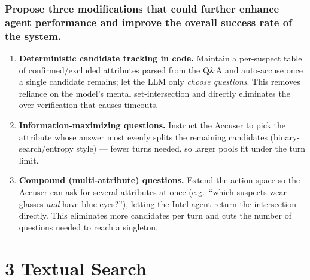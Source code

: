 \documentclass{article}
\begin{document}
\subsubsection*{Propose three modifications that could further enhance agent performance and
improve the overall success rate of the system.}
\begin{enumerate}[leftmargin=1.6em,itemsep=2pt]
  \item \textbf{Deterministic candidate tracking in code.} Maintain a per-suspect table of
  confirmed/excluded attributes parsed from the Q\&A and auto-accuse once a single candidate
  remains; let the LLM only \emph{choose questions}. This removes reliance on the model's
  mental set-intersection and directly eliminates the over-verification that causes
  timeouts.
  \item \textbf{Information-maximizing questions.} Instruct the Accuser to
  pick the attribute whose answer most evenly splits the remaining candidates
  (binary-search/entropy style) --- fewer turns needed, so larger pools fit under the turn
  limit.
  \item \textbf{Compound (multi-attribute) questions.} Extend the action space so the Accuser
  can ask for several attributes at once (e.g.\ ``which suspects wear glasses \emph{and} have
  blue eyes?''), letting the Intel agent return the intersection directly. This eliminates
  more candidates per turn and cuts the number of questions needed to reach a singleton.
\end{enumerate}

\section*{3 \quad Textual Search}
\end{document}
